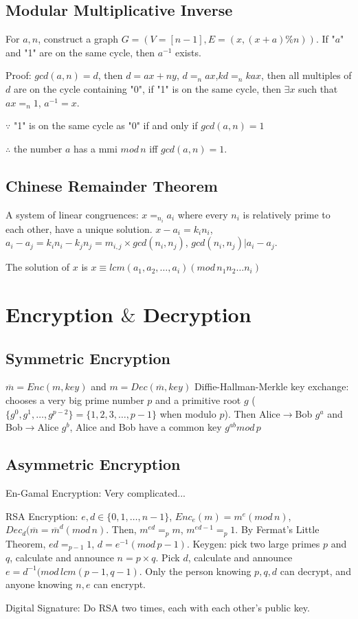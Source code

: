\documentclass[12pt,a4paper]{ctexrep}
\begin{document}
\subsection{Modular Multiplicative Inverse} 
For $a,n$, construct a graph $G=(V=[n-1],E=(x,(x+a)\%n))$. If "$a$" and "1" are on the same cycle, then $a^{-1}$ exists.

Proof: $gcd(a,n) = d$, then $d = ax+ny$, $d =_n ax$,$kd =_n kax$, then all multiples of $d$ are on the cycle containing "0", if "1" is on the same cycle, then $\exists x$ such that $ax =_n 1$, $a^{-1} = x$.

$\because$ "1" is on the same cycle as "0" if and only if $gcd(a,n)=1$

$\therefore$ the number $a$ has a mmi $mod\, n$ iff $gcd(a,n)=1$.

\subsection{Chinese Remainder Theorem}
A system of linear congruences: $x =_{n_i} a_i$ where every $n_i$ is relatively prime to each other, have a unique solution. $x-a_i = k_i n_i$, $a_i-a_j = k_in_i-k_jn_j = m_{i,j} \times gcd(n_i,n_j)$, $gcd(n_i,n_j)|a_i-a_j$. 

The solution of $x$ is $x\equiv lcm(a_1,a_2,\dots,a_i) (mod\, n_1n_2\dots n_i)$

\section{Encryption $\&$ Decryption}
\subsection{Symmetric Encryption}
$\overline{m} = Enc(m,key)$ and $m = Dec(\overline{m},key)$
Diffie-Hallman-Merkle key exchange: chooses a very big prime number $p$ and a primitive root $g$ ($\{g^0,g^1,\dots, g^{p-2}\} = \{1,2,3,\dots, p-1\}$ when modulo $p$). Then Alice$\rightarrow$Bob $g^a$ and Bob$\rightarrow$Alice $g^b$, Alice and Bob have a common key $g^{ab} mod\, p$

\subsection{Asymmetric Encryption}
En-Gamal Encryption: Very complicated...%

RSA Encryption:
$e,d \in \{0,1,\dots,n-1\}$, $Enc_e(m) = m^e (mod\, n)$, $Dec_d(\overline{m} = \overline{m}^d (mod\, n)$. Then, $m^{ed} =_p m$, $m^{ed-1} =_p 1$. By Fermat's Little Theorem, $ed =_{p-1} 1$, $d = e^{-1} (mod\, p-1)$. Keygen: pick two large primes $p$ and $q$, calculate and announce $n = p \times q$. Pick $d$, calculate and announce $e = d^{-1} (mod\, lcm(p-1,q-1)$. Only the person knowing $p,q,d$ can decrypt, and anyone knowing $n,e$ can encrypt.

Digital Signature:
Do RSA two times, each with each other's public key.

\ifdebug
\end{document}
